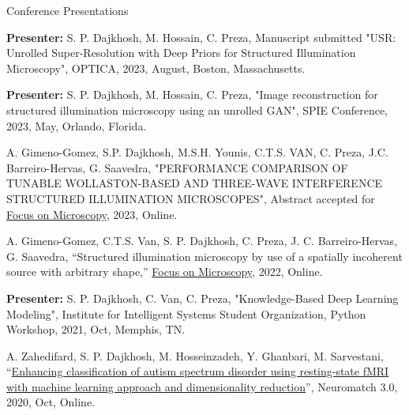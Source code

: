 \begin{cventries}
  \cventry
    {} %
    {Conference Presentations} %
    {} %
    {} %
    {
      \begin{cvitems} %
      \item{\textbf{Presenter:} S. P. Dajkhosh, M. Hossain,  C. Preza, Manuscript submitted "USR: Unrolled Super-Resolution with Deep Priors for Structured Illumination Microscopy", OPTICA, 2023, August, Boston, Massachusetts.}
        \item{\textbf{Presenter:} S. P. Dajkhosh, M. Hossain, C. Preza, "Image reconstruction for structured illumination microscopy using an unrolled GAN", SPIE Conference, 2023, May, Orlando, Florida.}
        \item{A. Gimeno-Gomez, S.P. Dajkhosh, M.S.H. Younis, C.T.S. VAN, C. Preza, J.C. Barreiro-Hervas, G. Saavedra, "PERFORMANCE COMPARISON OF TUNABLE WOLLASTON-BASED AND THREE-WAVE INTERFERENCE STRUCTURED ILLUMINATION MICROSCOPES", Abstract accepted for \href{https://www.focusonmicroscopy.org/}{Focus on Microscopy}, 2023, Online.}
        \item{A. Gimeno-Gomez, C.T.S. Van, S. P. Dajkhosh, C. Preza, J. C. Barreiro-Hervas, G. Saavedra, “Structured illumination microscopy by use of a spatially incoherent source with arbitrary shape,” \href{https://www.focusonmicroscopy.org/}{Focus on Microscopy}, 2022, Online.}
        \item{\textbf{Presenter: }S. P. Dajkhosh, C. Van, C. Preza, "Knowledge-Based Deep Learning Modeling", Institute for Intelligent Systems Student Organization, Python Workshop, 2021, Oct, Memphis, TN.}
        \item{A. Zahedifard, S. P. Dajkhosh, M. Hosseinzadeh, Y. Ghanbari, M. Sarvestani, “\href{https://neural-reckoning.github.io/nmc3_provisional_schedule/abstracts/anis-zahedifard-enhancing-classification-of-autism-spectrum.html}{Enhancing classification of autism spectrum disorder using resting-state fMRI with machine learning approach and dimensionality reduction}”, Neuromatch 3.0, 2020, Oct, Online.}
      \end{cvitems}
    }

 

\end{cventries}
